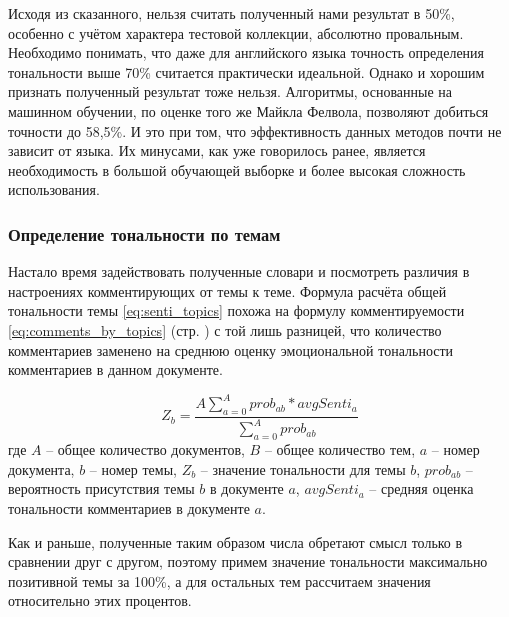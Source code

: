 Исходя из сказанного, нельзя считать полученный нами результат в 50\%, особенно с учётом характера тестовой коллекции, абсолютно провальным. Необходимо понимать, что даже для английского языка точность определения тональности выше 70\% считается практически идеальной. Однако и хорошим признать полученный результат тоже нельзя. Алгоритмы, основанные на машинном обучении, по оценке того же Майкла Фелвола, позволяют добиться точности до 58,5\%. И это при том, что эффективность данных методов почти не зависит от языка. Их минусами, как уже говорилось ранее, является необходимость в большой обучающей выборке и более высокая сложность использования.

\subsubsection{Определение тональности по темам}
Настало время задействовать полученные словари и посмотреть различия в настроениях комментирующих от темы к теме. Формула расчёта общей тональности темы \ref{eq:senti_topics} похожа на формулу комментируемости \ref{eq:comments_by_topics} (стр. \pageref{eq:comments_by_topics}) с той лишь разницей, что количество комментариев заменено на среднюю оценку эмоциональной тональности комментариев в данном документе.

\begin{equation}\label{eq:senti_topics}
Z_b = \frac{A \sum \limits_{a=0}^{A}prob_{ab} * avgSenti_a}{\sum_{a=0}^{A} prob_{ab}}
\end{equation}
где $A$ -- общее количество документов, $B$ -- общее количество тем, $a$ -- номер документа, $b$ -- номер темы, $Z_b$ -- значение тональности для темы $b$, $prob_{ab}$ -- вероятность присутствия темы $b$ в документе $a$, $avgSenti_a$ -- средняя оценка тональности комментариев в документе $a$.

Как и раньше, полученные таким образом числа обретают смысл только в сравнении друг с другом, поэтому примем значение тональности максимально позитивной темы за 100\%, а для остальных тем рассчитаем значения относительно этих процентов.

